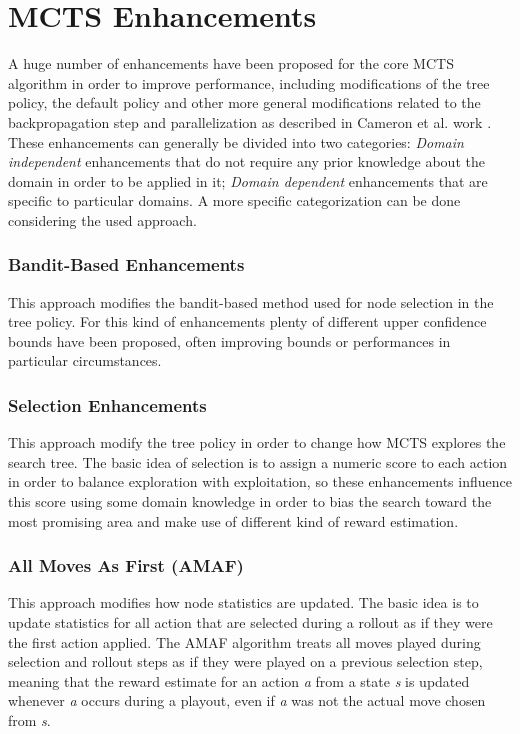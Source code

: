 \section{MCTS Enhancements}
A huge number of enhancements have been proposed for the core MCTS algorithm in order to improve performance, including modifications of the tree policy, the default policy and other more general modifications related to the backpropagation step and parallelization as described in Cameron et al. work \cite{journals/tciaig/BrownePWLCRTPSC12}. These enhancements can generally be divided into two categories: \textit{Domain independent} enhancements that do not require any prior knowledge about the domain in order to be applied in it; \textit{Domain dependent} enhancements that are specific to particular domains. A more specific categorization can be done considering the used approach.

\subsubsection{Bandit-Based Enhancements}
This approach modifies the bandit-based method used for node selection in the tree policy. For this kind of enhancements plenty of different upper confidence bounds have been proposed, often improving bounds or performances in particular circumstances.

\subsubsection{Selection Enhancements}
This approach modify the tree policy in order to change how MCTS explores the search tree. The basic idea of selection is to assign a numeric score to each action in order to balance exploration with exploitation, so these enhancements influence this score using some domain knowledge in order to bias the search toward the most promising area and make use of different kind of reward estimation.

\subsubsection{All Moves As First (AMAF)}
This approach modifies how node statistics are updated. The basic idea is to update statistics for all action that are selected during a rollout as if they were the first action applied. The AMAF algorithm treats all moves played during selection and rollout steps as if they were played on a previous selection step, meaning that the reward estimate for an action \textit{a} from a state \textit{s} is updated whenever \textit{a} occurs during a playout, even if \textit{a} was not the actual move chosen from \textit{s}.

